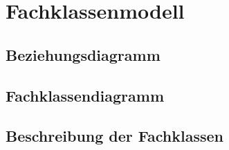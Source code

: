 \chapter{Fachklassenmodell}\label{ch:fachklassenmodell}


\section{Beziehungsdiagramm}\label{sec:beziehungsdiagramm}


\section{Fachklassendiagramm}\label{sec:fachklassendiagramm}


\section{Beschreibung der Fachklassen}\label{sec:beschreibung_der_fachklassen}
